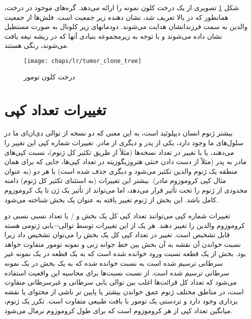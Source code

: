 شکل \ref{fig:ch_lr:tumor_clone_tree} تصویری از یک درخت کلون نمونه را ارائه می‌دهد. گره‌های موجود در درخت، همانطور که در بالا تعریف شد، نشان دهنده زیر جمعیت است. فلش‌ها از جمعیت والدین به سمت فرزندانشان هدایت می‌شوند. دودمانهای زیر کلونال به صورت مستطیل نشان داده می‌شوند و با توجه به زیرمجموعه بنیادی آنها که در ریشه تیغه یافت می‌شوند، رنگی هستند.


\begin{figure}[!ht]
	\centerline{\texttt{[image: chaps/lr/tumor\_clone\_tree]}}
	\caption{درخت کلون تومور}
	\label{fig:ch_lr:tumor_clone_tree}
\end{figure}




\section{تغییرات تعداد کپی }

بیشتر ژنوم انسان دیپلوئید است، به این معنی که دو نسخه از توالی دی‌ان‌ای ما در سلول‌های ما وجود دارد، یکی از پدر و دیگری از مادر. تغییرات شماره کپی این تغییر را می‌دهند، یا با تغییر در تعداد نسخه‌ها (مثلاً از طریق تکثیر کل ژنوم)، نسبت کپی‌های مادر به پدر (مثلاً از دست دادن خنثی هتروزیگوزیته در تعداد کپی‌ها، جایی که برای همان منطقه یک ژنوم والدین تکثیر می‌شود و دیگری حذف شده است) یا هر دو (به عنوان مثال کپی کروموزوم مادر). بیشتر این تغییرات (به استثنای تکثیر کل ژنوم) دامنه محدودی از ژنوم را تحت تأثیر قرار می‌دهد، اما می‌تواند از تأثیر یک ژن تا یک کروموزوم کامل باشد. این بخش از ژنوم تغییر یافته به عنوان یک بخش شناخته می‌شود.


تغییرات شماره کپی می‌توانند تعداد کپی کل یک بخش و / یا تعداد نسبی نسبی دو کروموزوم والدین را تغییر دهند. هر یک از این تغییرات توسط توالی¬یابی ژنومی هسته قابل تشخیص است. تغییر در تعداد کپی کل یک بخش را می‌توان تشخیص داد زیرا نسبت خواندن آن نقشه به آن بخش بین خط جوانه زنی و نمونه تومور متفاوت خواهد بود. بخش از یک قطعه نسبت ورود خوانده شده است که به یک قطعه در یک نمونه غیر سرطانی ترسیم شده است به نسبت خوانده شده که به یک بخش در یک نمونه سرطانی ترسیم شده است. از نسبت نسبت‌ها برای محاسبه این واقعیت استفاده می‌شود که تعداد کل قرائت‌ها اغلب بین توالی یابی سرطانی و غیرسرطانی متفاوت است، در مناطق مختلف ژنوم عمق خواندن بیشتر یا پایین تر ناشی از محتوای  یا نقشه برداری وجود دارد و تردستی یک تومور با بافت طبیعی متفاوت است. تکرر یک ژنوم، میانگین تعداد کپی از هر کروموزوم است که برای طول کروموزوم نرمال می‌شود.


